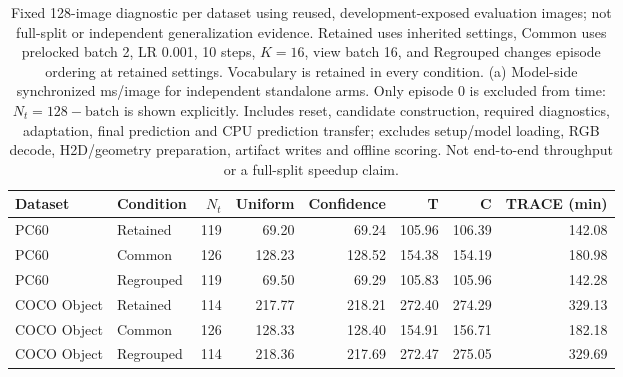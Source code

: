 \begin{table}[t]
\caption{Fixed 128-image diagnostic per dataset using reused, development-exposed evaluation images; not full-split or independent generalization evidence. Retained uses inherited settings, Common uses prelocked batch 2, LR 0.001, 10 steps, $K=16$, view batch 16, and Regrouped changes episode ordering at retained settings. Vocabulary is retained in every condition. (a) Model-side synchronized ms/image for independent standalone arms. Only episode 0 is excluded from time: $N_t=128-\mathrm{batch}$ is shown explicitly. Includes reset, candidate construction, required diagnostics, adaptation, final prediction and CPU prediction transfer; excludes setup/model loading, RGB decode, H2D/geometry preparation, artifact writes and offline scoring. Not end-to-end throughput or a full-split speedup claim.}
\label{tab:standalone-cost}
\centering\small
\begin{tabular}{@{}llrrrrrr@{}}
\toprule
Dataset & Condition & $N_t$ & Uniform & Confidence & T & C & TRACE (min) \\
\midrule
PC60 & Retained & 119 & 69.20 & 69.24 & 105.96 & 106.39 & 142.08 \\
PC60 & Common & 126 & 128.23 & 128.52 & 154.38 & 154.19 & 180.98 \\
PC60 & Regrouped & 119 & 69.50 & 69.29 & 105.83 & 105.96 & 142.28 \\
COCO Object & Retained & 114 & 217.77 & 218.21 & 272.40 & 274.29 & 329.13 \\
COCO Object & Common & 126 & 128.33 & 128.40 & 154.91 & 156.71 & 182.18 \\
COCO Object & Regrouped & 114 & 218.36 & 217.69 & 272.47 & 275.05 & 329.69 \\
\bottomrule
\end{tabular}


\end{table}
